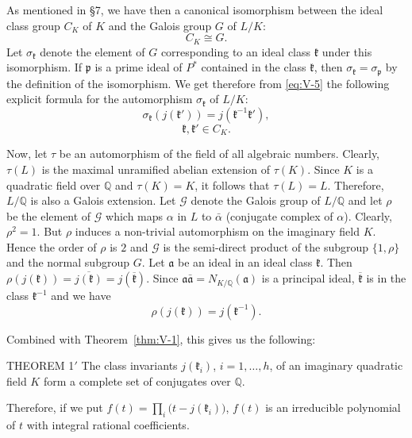 As mentioned in §7, we have then a canonical isomorphism between the
ideal class group $C_{K}$ of $K$ and the Galois group $G$ of $L/K$:
\[
C_{K}\cong G.
\]
Let $\sigma_{\mathfrak{k}}$ denote the element of $G$ corresponding to an
ideal class $\mathfrak{k}$ under this isomorphism. If $\mathfrak{p}$ is a
prime ideal of $P^{*}$ contained in the class $\mathfrak{k}$, then
$\sigma_{\mathfrak{k}}=\sigma_{\mathfrak{p}}$ by the definition of the
isomorphism. We get therefore from \eqref{eq:V-5} the following explicit
formula for the automorphism $\sigma_{\mathfrak{k}}$ of $L/K$:
\[
\sigma_{\mathfrak{k}}(j(\mathfrak{k}'))
=j(\mathfrak{k}^{-1}\mathfrak{k}'),
\tag{6}\label{eq:V-6}
\]
\[
\mathfrak{k},\mathfrak{k}'\in C_{K}.
\]

Now, let $\tau$ be an automorphism of the field of all algebraic numbers.
Clearly, $\tau(L)$ is the maximal unramified abelian extension of
$\tau(K)$. Since $K$ is a quadratic field over $\mathbb{Q}$ and
$\tau(K)=K$, it follows that $\tau(L)=L$. Therefore, $L/\mathbb{Q}$ is
also a Galois extension. Let $\mathcal{G}$ denote the Galois group of
$L/\mathbb{Q}$ and let $\rho$ be the element of $\mathcal{G}$ which maps
$\alpha$ in $L$ to $\bar{\alpha}$ (conjugate complex of $\alpha$).
Clearly, $\rho^{2}=1$. But $\rho$ induces a non-trivial automorphism on
the imaginary field $K$. Hence the order of $\rho$ is $2$ and
$\mathcal{G}$ is the semi-direct product of the subgroup $\{1,\rho\}$ and
the normal subgroup $G$. Let $\mathfrak{a}$ be an ideal in an ideal class
$\mathfrak{k}$. Then
$\rho(j(\mathfrak{k}))=\overline{j(\mathfrak{k})}
=j(\overline{\mathfrak{k}})$. Since
$\mathfrak{a}\bar{\mathfrak{a}}=N_{K/\mathbb{Q}}(\mathfrak{a})$ is a
principal ideal, $\overline{\mathfrak{k}}$ is in the class
$\mathfrak{k}^{-1}$ and we have
\[
\rho(j(\mathfrak{k}))=j(\mathfrak{k}^{-1}).
\tag{7}\label{eq:V-7}
\]

Combined with Theorem~\ref{thm:V-1}, this gives us the following:

\begin{namedstmt}{THEOREM 1$'$}
The class invariants $j(\mathfrak{k}_{i})$, $i=1,\ldots,h$, of an
imaginary quadratic field $K$ form a complete set of conjugates over
$\mathbb{Q}$.
\end{namedstmt}

Therefore, if we put $f(t)=\prod_{i}\bigl(t-j(\mathfrak{k}_{i})\bigr)$,
$f(t)$ is an irreducible polynomial of $t$ with integral rational
coefficients.

